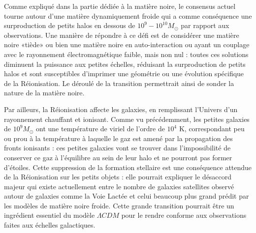 Comme expliqué dans la partie dédiée à la matière noire, le consensus actuel tourne autour d'une matière dynamiquement froide qui a comme conséquence une surproduction de petits halos en dessous de $10^9-10^{10} M_\odot$ par rapport aux observations. Une manière de répondre à ce défi est de considérer une matière noire «tiède»  ou bien une matière noire en auto-interaction ou ayant un couplage avec le rayonnement électromagnétique faible, mais non nul : toutes ces solutions diminuent la puissance aux petites échelles, réduisant la surproduction de petits halos et sont susceptibles d'imprimer une géométrie ou une évolution spécifique de la Réionisation. Le déroulé de la transition permettrait ainsi de sonder la nature de la matière noire.

Par ailleurs, la Réionisation affecte les galaxies, en remplissant l'Univers d'un rayonnement chauffant et ionisant. Comme vu précédemment, les petites galaxies de $10^9 M_\odot$ ont une température de viriel de l'ordre de $10^4$ K, correspondant peu ou prou à la température à laquelle le gaz est amené par la propagation des fronts ionisants : ces petites galaxies vont se trouver dans l'impossibilité de conserver ce gaz à l'équilibre au sein de leur halo et ne pourront pas former d'étoiles. Cette suppression de la formation stellaire est une conséquence attendue de la Réionisation sur les petits objets : elle pourrait expliquer le désaccord majeur qui existe actuellement entre le nombre de galaxies satellites observé autour de galaxies comme la Voie Lactée et celui beaucoup plus grand prédit par les modèles de matière noire froide. Cette grande transition pourrait être un ingrédient essentiel du modèle $\Lambda CDM$ pour le rendre conforme aux observations faites aux échelles galactiques.

